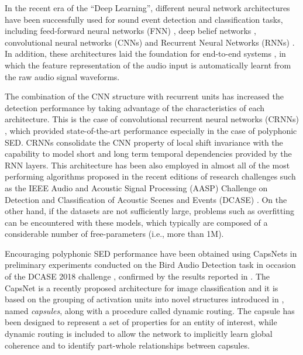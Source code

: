 In the recent era of the ``Deep Learning'', different neural network architectures have been successfully used for sound event detection and classification tasks, including feed-forward neural networks (FNN) \cite{mcloughlin2015robust}, deep belief networks \cite{mohamed2012acoustic}, convolutional neural networks (CNNs) \cite{piczak2015environmental} and Recurrent Neural Networks (RNNs) \cite{graves2013speech}. In addition, these architectures laid the foundation for end-to-end systems \cite{trigeorgis2016adieu, wu2017end}, in which the feature representation of the audio input is automatically learnt from the raw audio signal waveforms. 

The combination of the CNN structure with recurrent units has increased the detection performance by taking advantage of the characteristics of each architecture. This is the case of convolutional recurrent neural networks (CRNNs) \cite{cakir2017convolutional}, which provided state-of-the-art performance especially in the case of polyphonic SED. CRNNs consolidate the CNN property of local shift invariance with the capability to model short and long term temporal dependencies provided by the RNN layers. This architecture has been also employed in almost all of the most performing algorithms proposed in the recent editions of research challenges such as the IEEE Audio and Acoustic Signal Processing (AASP) Challenge on  Detection and Classification of Acoustic Scenes and Events (DCASE) \cite{DCASE2017Workshop}. On the other hand, if the datasets are not sufficiently large, problems such as overfitting can be encountered with these models, which typically are composed of a considerable number of free-parameters (i.e., more than 1M). 

Encouraging polyphonic SED performance have been obtained using CapsNets in preliminary experiments conducted on the Bird Audio Detection task in occasion of the DCASE 2018 challenge \cite{vesperini2018capsule}, confirmed by the results reported in \cite{iqbal2018capsule}.
The CapsNet \cite{sabour2017dynamic} is a recently proposed architecture for image classification and it is based on the grouping of activation units into novel structures introduced in \cite{hinton2011transforming}, named \textit{capsules}, along with a procedure called dynamic routing. The capsule has been designed to represent a set of properties for an entity of interest, while dynamic routing is included to allow the network to implicitly learn global coherence and to identify part-whole relationships between capsules.

